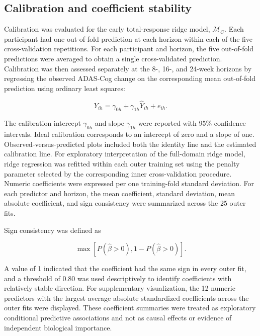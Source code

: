 \documentclass[11pt]{article}
\begin{document}
\subsection{Calibration and coefficient stability}

Calibration was evaluated for the early total-response ridge model,
$\mathcal{M}_{C}$. Each participant had one out-of-fold prediction at each horizon
within each of the five cross-validation repetitions. For each participant and horizon,
the five out-of-fold predictions were averaged to obtain a single cross-validated
prediction. Calibration was then assessed separately at the 8-, 16-, and 24-week horizons by
regressing the observed ADAS-Cog change on the corresponding mean out-of-fold prediction
using ordinary least squares:

\begin{equation}
Y_{ih}
=
\gamma_{0h}
+
\gamma_{1h}\hat{Y}_{ih}
+
e_{ih}.
\end{equation}

The calibration intercept $\gamma_{0h}$ and slope $\gamma_{1h}$ were reported with
95\% confidence intervals. Ideal calibration corresponds to an intercept of zero and
a slope of one. Observed-versus-predicted plots included both the identity line and
the estimated calibration line. For exploratory interpretation of the full-domain ridge model, ridge regression was
refitted within each outer training set using the penalty parameter selected by the
corresponding inner cross-validation procedure. Numeric coefficients were expressed per
one training-fold standard deviation. For each predictor and horizon, the mean coefficient,
standard deviation, mean absolute coefficient, and sign consistency were summarized across
the 25 outer fits.

Sign consistency was defined as

\begin{equation}
\max
\left[
P(\hat{\beta}>0),
1-P(\hat{\beta}>0)
\right].
\end{equation}

A value of 1 indicated that the coefficient had the same sign in every outer fit, and
a threshold of 0.80 was used descriptively to identify coefficients with relatively stable
direction. For supplementary visualization, the 12 numeric predictors with the largest
average absolute standardized coefficients across the outer fits were displayed.
These coefficient summaries were treated as exploratory conditional predictive associations
and not as causal effects or evidence of independent biological importance.
\end{document}
